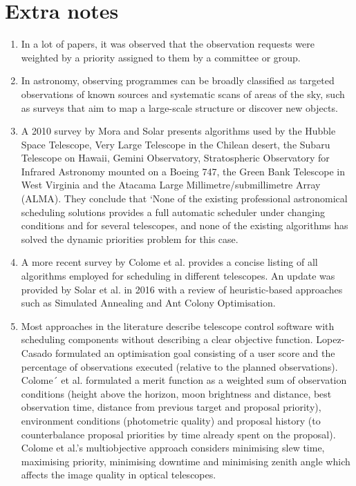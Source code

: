 \documentclass{article}
\begin{document}
\section*{Extra notes}
\begin{enumerate}
    \item In a lot of papers, it was observed that the observation requests were weighted by a priority assigned to them by a committee or group.
    \item In astronomy, observing programmes can be broadly classified as targeted observations of known sources and systematic scans of areas of the sky, such as surveys that
    aim to map a large-scale structure or discover new objects.
    \item A 2010 survey by Mora and Solar \cite{mora2010survey} presents algorithms used by the Hubble
    Space Telescope, Very Large Telescope in the Chilean desert, the Subaru Telescope
    on Hawaii, Gemini Observatory, Stratospheric Observatory for Infrared Astronomy
    mounted on a Boeing 747, the Green Bank Telescope in West Virginia and the Atacama Large Millimetre/submillimetre Array (ALMA). They conclude that ‘None of
    the existing professional astronomical scheduling solutions provides a full automatic
    scheduler under changing conditions and for several telescopes, and none of the
    existing algorithms has solved the dynamic priorities problem for this case.
    \item A more recent survey by Colome et al. \cite{colome2012research} provides a concise listing of all algorithms employed for scheduling in different telescopes. An update was provided
    by Solar et al. \cite{solar2016scheduling} in 2016 with a review of heuristic-based approaches such as
    Simulated Annealing and Ant Colony Optimisation.
    \item \label{point:objectiveFunctions} Most approaches in the literature describe telescope control software with scheduling
    components without describing a clear objective function. Lopez-Casado \cite{lopez2016development}
    formulated an optimisation goal consisting of a user score and the
    percentage of observations executed (relative to the planned observations). Colome´
    et al. \cite{colome2010tjo} formulated a merit function as a weighted sum of observation conditions
    (height above the horizon, moon brightness and distance, best observation time,
    distance from previous target and proposal priority), environment conditions (photometric quality) and proposal history (to counterbalance proposal priorities by time
    already spent on the proposal). Colome et al.’s \cite{colome2014artificial} multiobjective approach considers
    minimising slew time, maximising priority, minimising downtime and minimising
    zenith angle which affects the image quality in optical telescopes.
\end{enumerate}

\printbibliography
\end{document}
